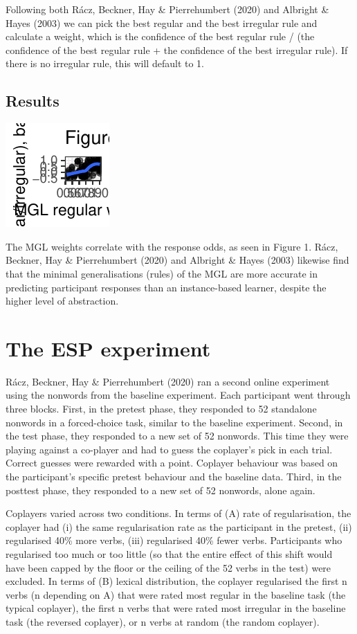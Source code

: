 \documentclass[
]{article}
\begin{document}
Following both Rácz, Beckner, Hay \& Pierrehumbert (2020) and Albright
\& Hayes (2003) we can pick the best regular and the best irregular rule
and calculate a weight, which is the confidence of the best regular rule
/ (the confidence of the best regular rule + the confidence of the best
irregular rule). If there is no irregular rule, this will default to 1.

\hypertarget{results}{%
\subsection{Results}\label{results}}

\includegraphics{figures/baseline_156-1.pdf}

The MGL weights correlate with the response odds, as seen in Figure 1.
Rácz, Beckner, Hay \& Pierrehumbert (2020) and Albright \& Hayes (2003)
likewise find that the minimal generalisations (rules) of the MGL are
more accurate in predicting participant responses than an instance-based
learner, despite the higher level of abstraction.

\hypertarget{the-esp-experiment}{%
\section{The ESP experiment}\label{the-esp-experiment}}

Rácz, Beckner, Hay \& Pierrehumbert (2020) ran a second online
experiment using the nonwords from the baseline experiment. Each
participant went through three blocks. First, in the pretest phase, they
responded to 52 standalone nonwords in a forced-choice task, similar to
the baseline experiment. Second, in the test phase, they responded to a
new set of 52 nonwords. This time they were playing against a co-player
and had to guess the coplayer's pick in each trial. Correct guesses were
rewarded with a point. Coplayer behaviour was based on the participant's
specific pretest behaviour and the baseline data. Third, in the posttest
phase, they responded to a new set of 52 nonwords, alone again.

Coplayers varied across two conditions. In terms of (A) rate of
regularisation, the coplayer had (i) the same regularisation rate as the
participant in the pretest, (ii) regularised 40\% more verbs, (iii)
regularised 40\% fewer verbs. Participants who regularised too much or
too little (so that the entire effect of this shift would have been
capped by the floor or the ceiling of the 52 verbs in the test) were
excluded. In terms of (B) lexical distribution, the coplayer regularised
the first n verbs (n depending on A) that were rated most regular in the
baseline task (the typical coplayer), the first n verbs that were rated
most irregular in the baseline task (the reversed coplayer), or n verbs
at random (the random coplayer).
\end{document}
